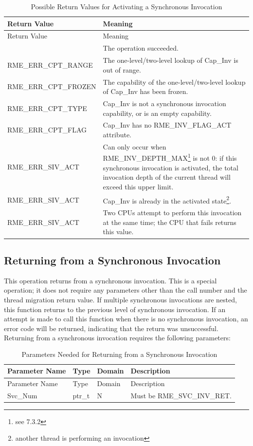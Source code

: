 \begin{xltabular}{\textwidth}{@{}>{\hsize\raggedright\arraybackslash}X>{\hsize\raggedright\arraybackslash}X@{}}
\caption{Possible Return Values for Activating a Synchronous Invocation}\label{tab:5-11-activate-sync-invocation-return-values}\\
\toprule
Return Value & Meaning\tabularnewline
\endfirsthead
\toprule
Return Value & Meaning\tabularnewline
\midrule
\endhead
\bottomrule
{} & The operation succeeded.\tabularnewline
    RME\_ERR\_CPT\_RANGE & The one-level/two-level lookup of Cap\_Inv is out of range.\tabularnewline
    RME\_ERR\_CPT\_FROZEN & The capability of the one-level/two-level lookup of Cap\_Inv has been frozen.\tabularnewline
    RME\_ERR\_CPT\_TYPE & Cap\_Inv is not a synchronous invocation capability, or is an empty capability.\tabularnewline
    RME\_ERR\_CPT\_FLAG & Cap\_Inv has no RME\_INV\_FLAG\_ACT attribute.\tabularnewline
    RME\_ERR\_SIV\_ACT & Can only occur when RME\_INV\_DEPTH\_MAX\footnote{see 7.3.2} is not 0: if this synchronous invocation is activated, the total invocation depth of the current thread will exceed this upper limit.\tabularnewline
    RME\_ERR\_SIV\_ACT & Cap\_Inv is already in the activated state\footnote{another thread is performing an invocation}.\tabularnewline
    RME\_ERR\_SIV\_ACT & Two CPUs attempt to perform this invocation at the same time; the CPU that fails returns this value.\tabularnewline
\end{xltabular}
\nopagebreak[4]

\subsection{Returning from a Synchronous Invocation}\label{subsec:5-return-from-sync-invocation}

This operation returns from a synchronous invocation. This is a special operation; it does not require any parameters other than the call number and the thread migration return value. If multiple synchronous invocations are nested, this function returns to the previous level of synchronous invocation. If an attempt is made to call this function when there is no synchronous invocation, an error code will be returned, indicating that the return was unsuccessful. Returning from a synchronous invocation requires the following parameters:

\begin{xltabular}{\textwidth}{@{}>{\hsize\raggedright\arraybackslash}X>{\hsize\raggedright\arraybackslash}X>{\hsize\raggedright\arraybackslash}X>{\hsize\raggedright\arraybackslash}X@{}}
\caption{Parameters Needed for Returning from a Synchronous Invocation}\label{tab:5-12-return-from-sync-invocation-parameters}\\
\toprule
Parameter Name & Type & Domain & Description\tabularnewline
\endfirsthead
\toprule
Parameter Name & Type & Domain & Description\tabularnewline
\midrule
\endhead
\bottomrule
\endlastfoot
Svc\_Num & ptr\_t & N & Must be RME\_SVC\_INV\_RET.\tabularnewline
\end{xltabular}
\nopagebreak[4]

